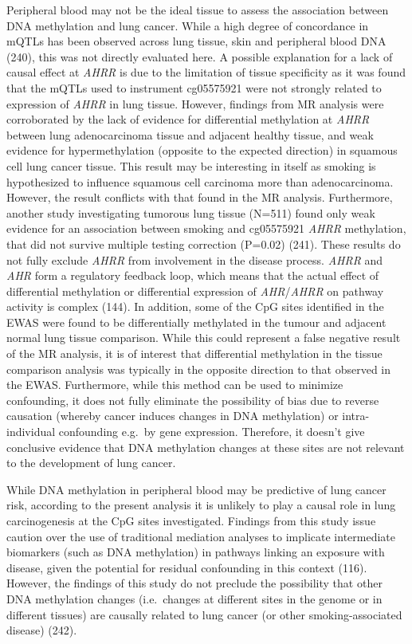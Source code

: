 \documentclass[11pt,oneside]{bristolthesis}
\begin{document}
Peripheral blood may not be the ideal tissue to assess the association between DNA methylation and lung cancer. While a high degree of concordance in mQTLs has been observed across lung tissue, skin and peripheral blood DNA (240), this was not directly evaluated here. A possible explanation for a lack of causal effect at \emph{AHRR} is due to the limitation of tissue specificity as it was found that the mQTLs used to instrument cg05575921 were not strongly related to expression of \emph{AHRR} in lung tissue. However, findings from MR analysis were corroborated by the lack of evidence for differential methylation at \emph{AHRR} between lung adenocarcinoma tissue and adjacent healthy tissue, and weak evidence for hypermethylation (opposite to the expected direction) in squamous cell lung cancer tissue. This result may be interesting in itself as smoking is hypothesized to influence squamous cell carcinoma more than adenocarcinoma. However, the result conflicts with that found in the MR analysis. Furthermore, another study investigating tumorous lung tissue (N=511) found only weak evidence for an association between smoking and cg05575921 \emph{AHRR} methylation, that did not survive multiple testing correction (P=0.02) (241). These results do not fully exclude \emph{AHRR} from involvement in the disease process. \emph{AHRR} and \emph{AHR} form a regulatory feedback loop, which means that the actual effect of differential methylation or differential expression of \emph{AHR}/\emph{AHRR} on pathway activity is complex (144). In addition, some of the CpG sites identified in the EWAS were found to be differentially methylated in the tumour and adjacent normal lung tissue comparison. While this could represent a false negative result of the MR analysis, it is of interest that differential methylation in the tissue comparison analysis was typically in the opposite direction to that observed in the EWAS. Furthermore, while this method can be used to minimize confounding, it does not fully eliminate the possibility of bias due to reverse causation (whereby cancer induces changes in DNA methylation) or intra-individual confounding e.g.~by gene expression. Therefore, it doesn't give conclusive evidence that DNA methylation changes at these sites are not relevant to the development of lung cancer.

While DNA methylation in peripheral blood may be predictive of lung cancer risk, according to the present analysis it is unlikely to play a causal role in lung carcinogenesis at the CpG sites investigated. Findings from this study issue caution over the use of traditional mediation analyses to implicate intermediate biomarkers (such as DNA methylation) in pathways linking an exposure with disease, given the potential for residual confounding in this context (116). However, the findings of this study do not preclude the possibility that other DNA methylation changes (i.e.~changes at different sites in the genome or in different tissues) are causally related to lung cancer (or other smoking-associated disease) (242).
\end{document}
